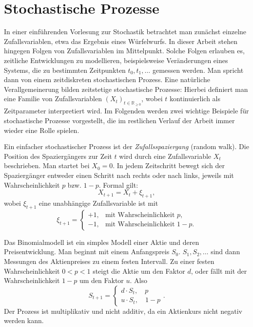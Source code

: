 \section{Stochastische Prozesse}

In einer einführenden Vorlesung zur Stochastik betrachtet man zunächst einzelne Zufallsvariablen, 
etwa das Ergebnis eines Würfelwurfs. In dieser Arbeit stehen hingegen Folgen von 
Zufallsvariablen im Mittelpunkt. Solche Folgen erlauben es, zeitliche Entwicklungen zu modellieren,
beispielsweise Veränderungen eines Systems, die zu bestimmten Zeitpunkten $t_0, t_1, \dots$ gemessen werden.
Man spricht dann von einem zeitdiskreten stochastischen Prozess. Eine natürliche 
Verallgemeinerung bilden zeitstetige stochastische Prozesse: Hierbei definiert man eine 
Familie von Zufallsvariablen $(X_t)_{t \in \mathbb{R}_{\ge 0}}$, wobei $t$ kontinuierlich als 
Zeitparameter interpretiert wird. Im Folgenden werden zwei wichtige Beispiele für stochastische Prozesse 
vorgestellt, die im restlichen Verlauf der Arbeit immer wieder eine Rolle spielen.

\begin{bsp}[Zufallsspaziergang]
Ein einfacher stochastischer Prozess ist der \textit{Zufallsspaziergang} (random walk).
Die Position des Spaziergängers zur Zeit $t$ wird durch eine Zufallsvariable $X_t$ beschrieben. 
Man startet bei $X_0 = 0$. In jedem Zeitschritt bewegt sich der Spaziergänger entweder 
einen Schritt nach rechts oder nach links, jeweils mit Wahrscheinlichkeit $p$ bzw. $1-p$. 
Formal gilt:
$$
X_{t+1} = X_t + \xi_{t+1},
$$
wobei $\xi_{t+1}$ eine unabhängige Zufallsvariable ist mit
$$
\xi_{t+1} = 
\begin{cases} 
+1, & \text{mit Wahrscheinlichkeit } p, \\
-1, & \text{mit Wahrscheinlichkeit } 1-p.
\end{cases}
$$

\end{bsp}

\begin{bsp}[Binomialmodell]
Das Binomialmodell ist ein simples Modell einer Aktie und deren Preisentwicklung. 
Man beginnt mit einem Anfangspreis $S_0$. $S_1, S_2, \dots$ sind dann Messungen des Aktienpreises zu einem festen Intervall.
 Zu einer festen Wahrscheinlichkeit $0 \lt p \lt 1$ steigt die Aktie um den Faktor $d$, oder fällt mit der Wahrscheinlichkeit $1-p$ um den Faktor $u$. Also
$$S_{t+1} = \begin{cases} d \cdot S_t, \quad  p \\ u \cdot S_t, \quad 1-p\end{cases}.$$
Der Prozess ist multiplikativ und nicht additiv, da ein Aktienkurs nicht negativ werden kann.
\end{bsp}

